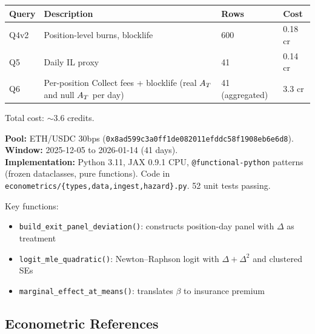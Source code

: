 \begin{center}
\begin{tabular}{@{}llll@{}}
\toprule
Query & Description & Rows & Cost \\
\midrule
Q4v2 & Position-level burns, blocklife & 600 & 0.18 cr \\
Q5 & Daily IL proxy & 41 & 0.14 cr \\
Q6 & Per-position Collect fees + blocklife (real $A_T$ and null $A_T$ per day)
  & 41 (aggregated) & 3.3 cr \\
\bottomrule
\end{tabular}
\end{center}

Total cost: ${\sim}3.6$ credits.

\textbf{Pool:} ETH/USDC 30bps (\texttt{0x8ad599c3a0ff1de082011efddc58f1908eb6e6d8}).\\
\textbf{Window:} 2025-12-05 to 2026-01-14 (41 days).\\
\textbf{Implementation:} Python 3.11, JAX 0.9.1 CPU, \texttt{@functional-python}
patterns (frozen dataclasses, pure functions).
Code in \texttt{econometrics/\{types,data,ingest,hazard\}.py}. 52 unit tests
passing.

Key functions:
\begin{itemize}
  \item \texttt{build\_exit\_panel\_deviation()}: constructs position-day panel
    with $\Delta$ as treatment
  \item \texttt{logit\_mle\_quadratic()}: Newton--Raphson logit with
    $\Delta + \Delta^2$ and clustered SEs
  \item \texttt{marginal\_effect\_at\_means()}: translates $\beta$ to insurance
    premium
\end{itemize}


\subsection{Econometric References}


